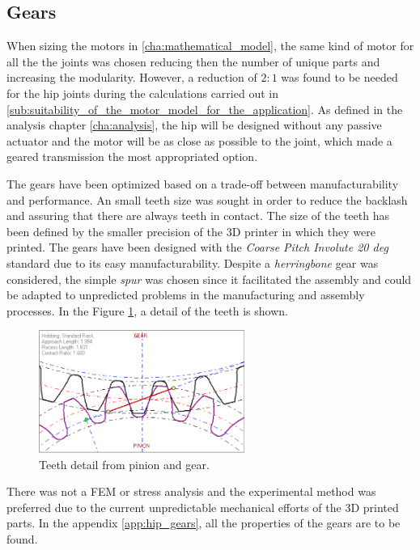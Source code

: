 \subsection{Gears} %
\label{sub:gears}
When sizing the motors in \ref{cha:mathematical_model}, the same kind of motor for all the the joints was chosen reducing then the number of unique parts and increasing the modularity.
However, a reduction of $2:1$ was found to be needed for the hip joints during the calculations carried out in \ref{sub:suitability_of_the_motor_model_for_the_application}.
As defined in the analysis chapter \ref{cha:analysis}, the hip will be designed without any passive actuator and the motor will be as close as possible to the joint, which made a geared transmission the most appropriated option.

The gears have been optimized based on a trade-off between manufacturability and performance.
An small teeth size was sought in order to reduce the backlash and assuring that there are always teeth in contact.
The size of the teeth has been defined by the smaller precision of the 3D printer in which they were printed.
The gears have been designed with the \textit{Coarse Pitch Involute 20 deg} standard due to its easy manufacturability.
Despite a \textit{herringbone} gear was considered, the simple \textit{spur} was chosen since it facilitated the assembly and could be adapted to unpredicted problems in the manufacturing and assembly processes. 
In the Figure \ref{fig:teeth_detail}, a detail of the teeth is shown.

\begin{figure}[ht!]
  \centering
  \includegraphics[width=0.6\textwidth]{figures/hip_gears}
  \caption{Teeth detail from pinion and gear.}
  \label{fig:teeth_detail}
\end{figure}

There was not a FEM or stress analysis and the experimental method was preferred due to the current unpredictable mechanical efforts of the 3D printed parts.
In the appendix \ref{app:hip_gears}, all the properties of the gears are to be found.


